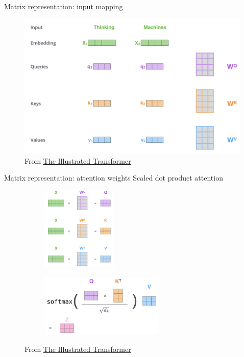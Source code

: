 \documentclass[usenames,dvipsnames,notes,11pt,aspectratio=169,hyperref={colorlinks=true, linkcolor=blue}]{beamer}
\begin{document}
\begin{frame}
    {Matrix representation: input mapping}
    \begin{figure}
        \includegraphics[height=7cm]{figures/self-attn-matrix.png}
        \caption{From \href{https://jalammar.github.io/illustrated-transformer}{The Illustrated Transformer}}
    \end{figure}
\end{frame}

\begin{frame}
    {Matrix representation: attention weights}
    Scaled dot product attention
    \begin{figure}
        \begin{subfigure}{.4\textwidth}
        \includegraphics[height=4cm]{figures/scaled-attn}
        \end{subfigure}
        \begin{subfigure}{.5\textwidth}
        \includegraphics[height=3cm]{figures/scaled-attn-2}
        \end{subfigure}
        \caption{From \href{https://jalammar.github.io/illustrated-transformer}{The Illustrated Transformer}}
    \end{figure}
\end{frame}
\end{document}
